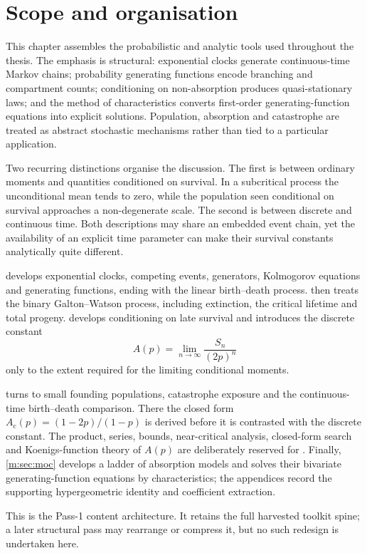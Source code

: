 \section{Scope and organisation}\label{m:sec:intro}

This chapter assembles the probabilistic and analytic tools used throughout the
thesis.  The emphasis is structural: exponential clocks generate continuous-time
Markov chains; probability generating functions encode branching and compartment
counts; conditioning on non-absorption produces quasi-stationary laws; and the
method of characteristics converts first-order generating-function equations into
explicit solutions.  Population, absorption and catastrophe are treated as
abstract stochastic mechanisms rather than tied to a particular application.

Two recurring distinctions organise the discussion.  The first is between
ordinary moments and quantities conditioned on survival.  In a subcritical process
the unconditional mean tends to zero, while the population seen conditional on
survival approaches a non-degenerate scale.  The second is between discrete and
continuous time.  Both descriptions may share an embedded event chain, yet the
availability of an explicit time parameter can make their survival constants
analytically quite different.

 develops exponential clocks, competing events, generators,
Kolmogorov equations and generating functions, ending with the linear
birth--death process.   then treats the binary Galton--Watson
process, including extinction, the critical lifetime and total progeny.
 develops conditioning on late survival and introduces the discrete
constant
\[
  A(p)=\lim_{n\to\infty}\frac{S_n}{(2p)^n}
\]
only to the extent required for the limiting conditional moments.

 turns to small founding populations, catastrophe exposure and
the continuous-time birth--death comparison.  There the closed form
\(A_{\mathrm c}(p)=(1-2p)/(1-p)\) is derived before it is contrasted with the
discrete constant.  The product, series, bounds, near-critical analysis,
closed-form search and Koenigs-function theory of \(A(p)\) are deliberately reserved
for \ChA.  Finally, \cref{m:sec:moc} develops a ladder of absorption models and
solves their bivariate generating-function equations by characteristics; the
appendices record the supporting hypergeometric identity and coefficient
extraction.

This is the Pass-1 content architecture.  It retains the full harvested toolkit
spine; a later structural pass may rearrange or compress it, but no such redesign is
undertaken here.
